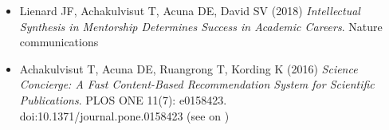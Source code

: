 \begin{itemize}[leftmargin=0cm, label={}]
\item Lienard JF, Achakulvisut T, Acuna DE, David SV (2018) {\em Intellectual Synthesis in Mentorship Determines Success in Academic Careers}. Nature communications

\item Achakulvisut T, Acuna DE, Ruangrong T, Kording K (2016) {\em Science Concierge: A Fast Content-Based Recommendation System for Scientific Publications}. PLOS ONE 11(7): e0158423.\\ doi:10.1371/journal.pone.0158423 
(see on \href{https://github.com/titipata/science_concierge}{\faGithubAlt})


\end{itemize}
